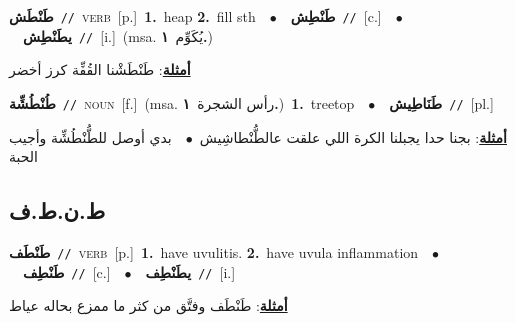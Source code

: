 \documentclass[10pt,a4paper,twoside]{article} %
\begin{document}
\begin{multicols}{2}
{\setlength\topsep{0pt}\textbf{\foreignlanguage{arabic}{طَنْطَش}}\ {\color{gray}\texttt{//}\color{black}}\ \textsc{verb}\ [p.]\ \textbf{1.}~heap  \textbf{2.}~fill sth\ \ $\bullet$\ \ \setlength\topsep{0pt}\textbf{\foreignlanguage{arabic}{طَنْطِش}}\ {\color{gray}\texttt{//}\color{black}}\ [c.]\ \ $\bullet$\ \ \setlength\topsep{0pt}\textbf{\foreignlanguage{arabic}{يطَنْطِش}}\ {\color{gray}\texttt{//}\color{black}}\ [i.]\ \color{gray}(msa. \foreignlanguage{arabic}{يُكَوِّم}~\foreignlanguage{arabic}{\textbf{١.}})\color{black}\  \begin{flushright}\color{gray}\foreignlanguage{arabic}{\textbf{\underline{\foreignlanguage{arabic}{أمثلة}}}: طَنْطَشْنا القُفِّة كرز أخضر}\end{flushright}\color{black}} \vspace{2mm}

{\setlength\topsep{0pt}\textbf{\foreignlanguage{arabic}{طُنْطُشِّة}}\ {\color{gray}\texttt{//}\color{black}}\ \textsc{noun}\ [f.]\ \color{gray}(msa. \foreignlanguage{arabic}{رأس الشجرة}~\foreignlanguage{arabic}{\textbf{١.}})\color{black}\ \textbf{1.}~treetop\ \ $\bullet$\ \ \setlength\topsep{0pt}\textbf{\foreignlanguage{arabic}{طَنَاطِيش}}\ {\color{gray}\texttt{//}\color{black}}\ [pl.]\  \begin{flushright}\color{gray}\foreignlanguage{arabic}{\textbf{\underline{\foreignlanguage{arabic}{أمثلة}}}: بجنا حدا يجبلنا الكرة اللي علقت عالطُّنْطاشِيش\ $\bullet$\ \  بدي أوصل للطُّنْطُشِّة وأجيب الحبة}\end{flushright}\color{black}} \vspace{2mm}

\vspace{-3mm}
\subsection*{\color{blue}\foreignlanguage{arabic}{ط.ن.ط.ف}\color{blue}{}} 

{\setlength\topsep{0pt}\textbf{\foreignlanguage{arabic}{طَنْطَف}}\ {\color{gray}\texttt{//}\color{black}}\ \textsc{verb}\ [p.]\ \textbf{1.}~have uvulitis.  \textbf{2.}~have uvula inflammation\ \ $\bullet$\ \ \setlength\topsep{0pt}\textbf{\foreignlanguage{arabic}{طَنْطِف}}\ {\color{gray}\texttt{//}\color{black}}\ [c.]\ \ $\bullet$\ \ \setlength\topsep{0pt}\textbf{\foreignlanguage{arabic}{يطَنْطِف}}\ {\color{gray}\texttt{//}\color{black}}\ [i.]\  \begin{flushright}\color{gray}\foreignlanguage{arabic}{\textbf{\underline{\foreignlanguage{arabic}{أمثلة}}}: طَنْطَف وفتَّق من كثر ما ممزع بحاله عياط}\end{flushright}\color{black}} \vspace{2mm}


\end{multicols}
\end{document}
